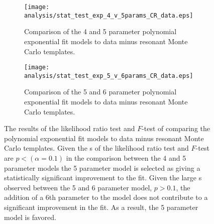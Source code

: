 \begin{figure}[htbp]
 \centering
 \begin{subfigure}[t]{0.48\textwidth}
  \centering
  \texttt{[image: analysis/stat\_test\_exp\_4\_v\_5params\_CR\_data.eps]}
  \caption[Comparison of the 4 and 5 parameter polynomial exponential fit models.]{%
   Comparison of the 4 and 5 parameter polynomial exponential fit models to \CRQCD{} data minus resonant Monte Carlo templates.}
  \label{fig:stat_test_exp_4_v_5params}
 \end{subfigure}%
 \quad
 \begin{subfigure}[t]{0.48\textwidth}
  \centering
  \texttt{[image: analysis/stat\_test\_exp\_5\_v\_6params\_CR\_data.eps]}
  \caption[Comparison of the 5 and 6 parameter polynomial exponential fit models.]{%
   Comparison of the 5 and 6 parameter polynomial exponential fit models to \CRQCD{} data minus resonant Monte Carlo templates.}
  \label{fig:stat_test_exp_5_v_6params}
 \end{subfigure}
 \caption[Results of the likelihood ratio test and $F$-test of comparing the polynomial exponential fit models.]{%
  The results of the likelihood ratio test and $F$-test of comparing the polynomial exponential fit models to \CRQCD{} data minus resonant Monte Carlo templates.
  Given the \pvalue{}s of the likelihood ratio test and $F$-test are $p < \left(\alpha=0.1\right)$ in the comparison between the 4 and 5 parameter models the 5 parameter model is selected as giving a statistically significant improvement to the fit.
  Given the large \pvalue{}s observed between the 5 and 6 parameter model, $p > 0.1$, the addition of a 6th parameter to the model does not contribute to a significant improvement in the fit.
  As a result, the 5 parameter model is favored.}
 \label{fig:likelihood_ratio_test_polyexp}
\end{figure}

